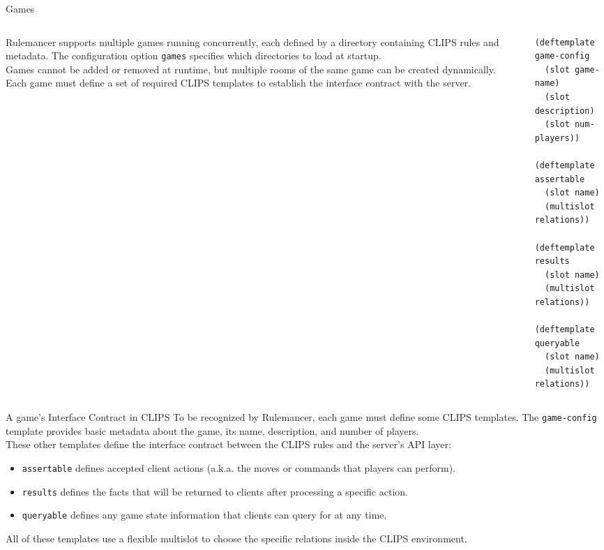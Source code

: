 \documentclass[aspectratio=169]{beamer}
\begin{document}
\begin{frame}[fragile]{Games}
  \begin{columns}
    \begin{column}{0.6\textwidth}
      Rulemancer supports multiple games running concurrently, each defined by a directory containing CLIPS rules and metadata.
      The configuration option \texttt{games} specifies which directories to load at startup. \\
      \vspace{0.4cm}
      Games cannot be added or removed at runtime, but multiple rooms of the same game can be created dynamically. \\
      \vspace{0.4cm}
      Each game must define a set of required CLIPS templates to establish the interface contract with the server.
    \end{column}
    \begin{column}{0.4\textwidth}
        \small
        \begin{verbatim}
(deftemplate game-config
  (slot game-name)
  (slot description)
  (slot num-players))

(deftemplate assertable
  (slot name)
  (multislot relations))

(deftemplate results
  (slot name)
  (multislot relations))

(deftemplate queryable
  (slot name)
  (multislot relations))
        \end{verbatim}
    \end{column}
  \end{columns}
\end{frame}

\begin{frame}{A game's Interface Contract in CLIPS}
To be recognized by Rulemancer, each game must define some CLIPS templates. The \texttt{game-config} template 
provides basic metadata about the game, its name, description, and number of players. \\
\vspace{0.3cm}
These other templates define the interface contract between the CLIPS rules and the server's API layer:
\begin{itemize}
  \item \texttt{assertable} defines accepted client actions (a.k.a. the moves or commands that players can perform).
  \item \texttt{results} defines the facts that will be returned to clients after processing a specific action.
  \item \texttt{queryable} defines any game state information that clients can query for at any time.
\end{itemize}
All of these templates use a flexible multislot to choose the specific relations inside the CLIPS environment.
\end{frame}
\end{document}

